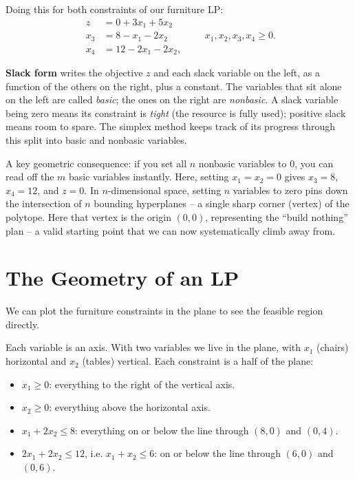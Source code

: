 Doing this for both constraints of our furniture LP:
\[
\begin{aligned}
z   &= 0 + 3x_1 + 5x_2 \\
x_3 &= 8 - x_1 - 2x_2 \\
x_4 &= 12 - 2x_1 - 2x_2,
\end{aligned}
\qquad x_1,x_2,x_3,x_4 \ge 0 .
\]

\begin{focusbox}
\textbf{Slack form} writes the objective $z$ and each slack variable on the
left, as a function of the others on the right, plus a constant. The variables
that sit alone on the left are called \emph{basic}; the ones on the right are
\emph{nonbasic}. A slack variable being zero means its constraint is
\emph{tight} (the resource is fully used); positive slack means room to spare.
The simplex method keeps track of its progress through this split into basic
and nonbasic variables.
\end{focusbox}

A key geometric consequence: if you set all $n$ nonbasic variables to $0$, you
can read off the $m$ basic variables instantly. Here, setting $x_1 = x_2 = 0$
gives $x_3 = 8$, $x_4 = 12$, and $z = 0$. In $n$-dimensional space, setting $n$
variables to zero pins down the intersection of $n$ bounding hyperplanes -- a
single sharp corner (vertex) of the polytope. Here that vertex is the origin
$(0,0)$, representing the ``build nothing'' plan -- a valid starting point that
we can now systematically climb away from.

\section{The Geometry of an LP}
\label{ch28:geometry}

We can plot the furniture constraints in the plane to see the feasible region directly.

Each variable is an axis. With two variables we live in the plane, with $x_1$
(chairs) horizontal and $x_2$ (tables) vertical. Each constraint is a half of
the plane:
\begin{itemize}
\item $x_1 \ge 0$: everything to the right of the vertical axis.
\item $x_2 \ge 0$: everything above the horizontal axis.
\item $x_1 + 2x_2 \le 8$: everything on or below the line through $(8,0)$ and
  $(0,4)$.
\item $2x_1 + 2x_2 \le 12$, i.e. $x_1 + x_2 \le 6$: on or below the line
  through $(6,0)$ and $(0,6)$.
\end{itemize}

